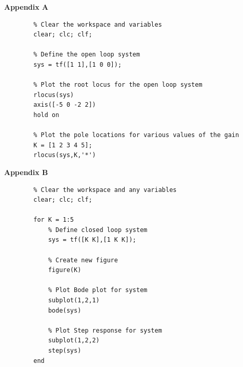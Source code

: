 \documentclass{article}
\begin{document}
	\textbf{Appendix A}\\
	
	\begin{lstlisting}
		% Clear the workspace and variables
		clear; clc; clf;
		
		% Define the open loop system
		sys = tf([1 1],[1 0 0]);
		
		% Plot the root locus for the open loop system
		rlocus(sys)
		axis([-5 0 -2 2])
		hold on
		
		% Plot the pole locations for various values of the gain
		K = [1 2 3 4 5];
		rlocus(sys,K,'*')
	\end{lstlisting}
	
	\newpage

	\textbf{Appendix B}\\
	
	\begin{lstlisting}
		% Clear the workspace and any variables
		clear; clc; clf;
		
		for K = 1:5
			% Define closed loop system
			sys = tf([K K],[1 K K]);
		
			% Create new figure
			figure(K)
		
			% Plot Bode plot for system
			subplot(1,2,1)
			bode(sys)
		
			% Plot Step response for system
			subplot(1,2,2)
			step(sys)
		end
	\end{lstlisting}
	
\end{document}
